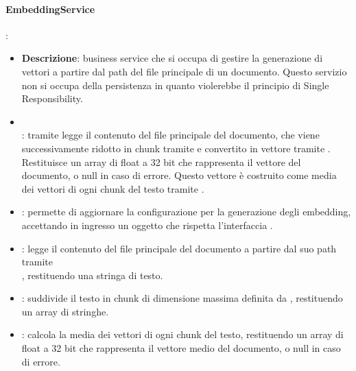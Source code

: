 \paragraph{EmbeddingService}:
\begin{itemize}
    \item \textbf{Descrizione}: business service che si occupa di gestire la generazione di vettori a partire dal path del file principale di un documento. Questo servizio non si occupa della persistenza in quanto violerebbe il principio di Single Responsibility.
    \item {} \\ : tramite  legge il contenuto del file principale del documento, che viene successivamente ridotto in chunk tramite  e convertito in vettore tramite . Restituisce un array di float a 32 bit che rappresenta il vettore del documento, o null in caso di errore. Questo vettore è costruito come media dei vettori di ogni chunk del testo tramite .
    \item {}: permette di aggiornare la configurazione per la generazione degli embedding, accettando in ingresso un oggetto che rispetta l'interfaccia .
    \item {}: legge il contenuto del file principale del documento a partire dal suo path tramite \\ , restituendo una stringa di testo.
    \item {}: suddivide il testo in chunk di dimensione massima definita da , restituendo un array di stringhe.
    \item {}: calcola la media dei vettori di ogni chunk del testo, restituendo un array di float a 32 bit che rappresenta il vettore medio del documento, o null in caso di errore.
\end{itemize}

